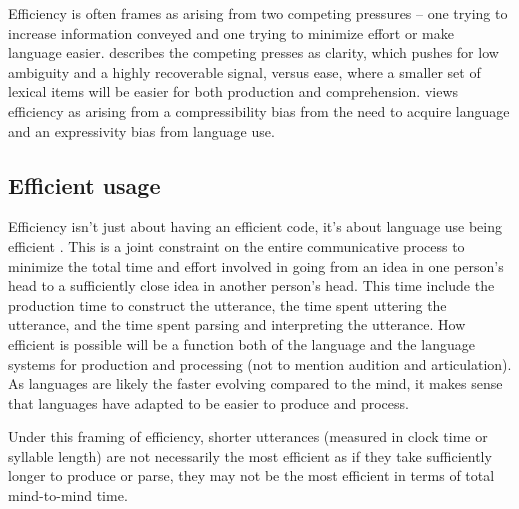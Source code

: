 \documentclass[]{article}
\begin{document}
Efficiency is often frames as arising from two competing pressures -- one trying to increase information conveyed and one trying to minimize effort or make language easier. \cite{piantadosi2012} describes the competing presses as clarity, which pushes for low ambiguity and a highly recoverable signal, versus ease, where a smaller set of lexical items will be easier for both production and comprehension. \cite{kirby2015} views efficiency as arising from a compressibility bias from the need to acquire language and an expressivity bias from language use. 

%
%



\subsection{Efficient usage}

Efficiency isn't just about having an efficient code, it's about language use being efficient \cite{gibson2019}. This is a joint constraint on the entire communicative process to minimize the total time and effort involved in going from an idea in one person's head to a sufficiently close idea in another person's head. This time include the production time to construct the utterance, the time spent uttering the utterance, and the time spent parsing and interpreting the utterance. How efficient is possible will be a function both of the language and the language systems for production and processing (not to mention audition and articulation). As languages are likely the faster evolving compared to the mind, it makes sense that languages have adapted to be easier to produce and process. 

Under this framing of efficiency, shorter utterances (measured in clock time or syllable length) are not necessarily the most efficient as if they take sufficiently longer to produce or parse, they may not be the most efficient in terms of total mind-to-mind time. 
\end{document}
